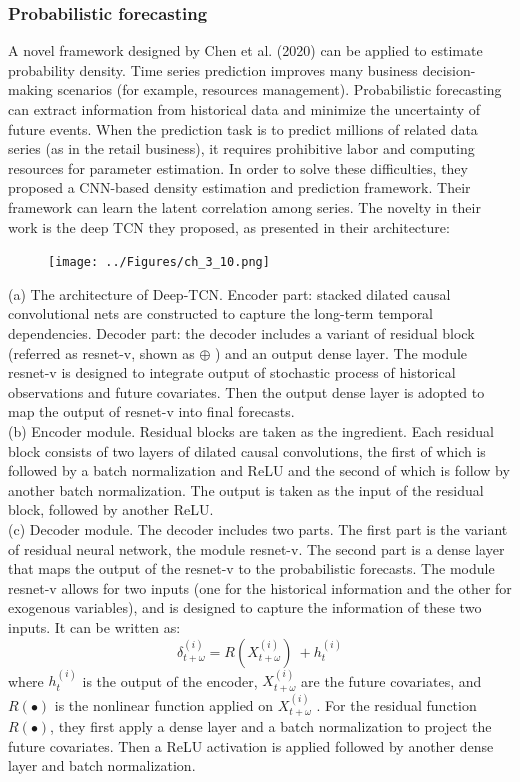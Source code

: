 \subsubsection{Probabilistic forecasting}
A novel framework designed by Chen et al. (2020) can be applied to estimate probability density. Time series prediction improves many business decision-making scenarios (for example, resources management). Probabilistic forecasting can extract information from historical data and minimize the uncertainty of future events. When the prediction task is to predict millions of related data series (as in the retail business), it requires prohibitive labor and computing resources for parameter estimation. In order to solve these difficulties, they proposed a CNN-based density estimation and prediction framework. Their framework can learn the latent correlation among series. The novelty in their work is the deep TCN they proposed, as presented in their architecture:
\begin{figure}[H]
    \texttt{[image: ../Figures/ch\_3\_10.png]}
\end{figure}
(a) The architecture of Deep-TCN. Encoder part: stacked dilated causal convolutional nets are constructed to capture the long-term temporal dependencies. Decoder part: the decoder includes a variant of residual block (referred as resnet-v, shown as $\oplus$ ) and an output dense layer. The module resnet-v is designed to integrate output of stochastic process of historical observations and future covariates. Then the output dense layer is adopted to map the output of resnet-v into final forecasts. \\
(b) Encoder module. Residual blocks are taken as the ingredient. Each residual block consists of two layers of dilated causal convolutions, the first of which is followed by a batch normalization and ReLU and the second of which is follow by another batch normalization. The output is taken as the input of the residual block, followed by another ReLU. \\
(c) Decoder module. The decoder includes two parts. The first part is the variant of residual neural network, the module resnet-v. The second part is a dense layer that maps the output of the resnet-v to the probabilistic forecasts. The module resnet-v allows for two inputs (one for the historical information and the other for exogenous variables), and is designed to capture the information of these two inputs. It can be written as:
$$\delta_{t+\omega}^{(i)}=R(X_{t+\omega}^{\left(i\right)})\ +h_t^{\left(i\right)}$$
where $h_t^{\left(i\right)}$  is the output of the encoder, $X_{t+\omega}^{\left(i\right)}$  are the future covariates, and $R(\bullet)$  is the nonlinear function applied on $X_{t+\omega}^{\left(i\right)}$ . For the residual function  $R(\bullet)$, they first apply a dense layer and a batch normalization to project the future covariates. Then a ReLU activation is applied followed by another dense layer and batch normalization.

